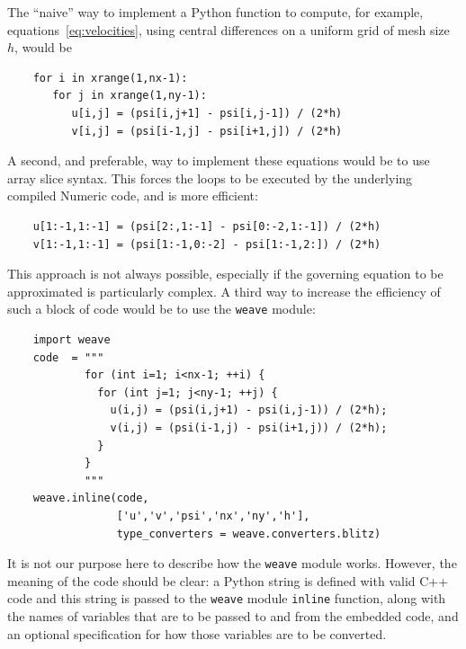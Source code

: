 \documentclass[acmtocl]{acmtrans2m}
\begin{document}
The ``naive'' way to implement a Python function to compute, for
example, equations~\ref{eq:velocities}, using central differences on a
uniform grid of mesh size $h$, would be
\begin{verbatim}
    for i in xrange(1,nx-1):
       for j in xrange(1,ny-1):
          u[i,j] = (psi[i,j+1] - psi[i,j-1]) / (2*h)
          v[i,j] = (psi[i-1,j] - psi[i+1,j]) / (2*h)
\end{verbatim}
A second, and preferable, way to implement these equations would be to
use array slice syntax.  This forces the loops to be executed by the
underlying compiled Numeric code, and is more efficient:
\begin{verbatim}
    u[1:-1,1:-1] = (psi[2:,1:-1] - psi[0:-2,1:-1]) / (2*h)
    v[1:-1,1:-1] = (psi[1:-1,0:-2] - psi[1:-1,2:]) / (2*h)
\end{verbatim}
This approach is not always possible, especially if the governing
equation to be approximated is particularly complex.  A third way to
increase the efficiency of such a block of code would be to use the
{\tt weave} module:
\begin{verbatim}
    import weave
    code  = """
            for (int i=1; i<nx-1; ++i) {
              for (int j=1; j<ny-1; ++j) {
                u(i,j) = (psi(i,j+1) - psi(i,j-1)) / (2*h);
                v(i,j) = (psi(i-1,j) - psi(i+1,j)) / (2*h);
              }
            }
            """
    weave.inline(code,
                 ['u','v','psi','nx','ny','h'],
                 type_converters = weave.converters.blitz)
\end{verbatim}
It is not our purpose here to describe how the {\tt weave} module
works.  However, the meaning of the code should be clear: a Python
string is defined with valid C++ code and this string is passed to the
{\tt weave} module {\tt inline} function, along with the names of
variables that are to be passed to and from the embedded code, and an
optional specification for how those variables are to be converted.
\end{document}
